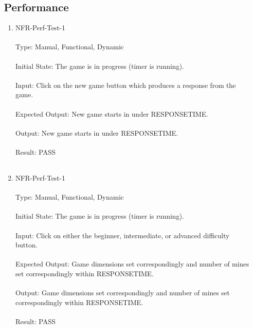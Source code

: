 \documentclass[12pt, titlepage]{article}
\begin{document}
\newpage
\subsection{Performance}
\begin{enumerate}
\item{NFR-Perf-Test-1\\\\}
Type: Manual, Functional, Dynamic\\\\				
Initial State: The game is in progress (timer is running).\\\\
Input: Click on the new game button which produces a response from the game.\\\\
Expected Output: New game starts in under RESPONSETIME.\\\\
Output: New game starts in under RESPONSETIME.\\\\
Result: PASS\\\\

\item{NFR-Perf-Test-1\\\\}
Type: Manual, Functional, Dynamic\\\\				
Initial State: The game is in progress (timer is running).\\\\
Input: Click on either the beginner, intermediate, or advanced difficulty button.\\\\
Expected Output: Game dimensions set correspondingly and number of mines set correspondingly within RESPONSETIME.\\\\
Output: Game dimensions set correspondingly and number of mines set correspondingly within RESPONSETIME.\\\\
Result: PASS\\\\


\end{enumerate}
\end{document}

